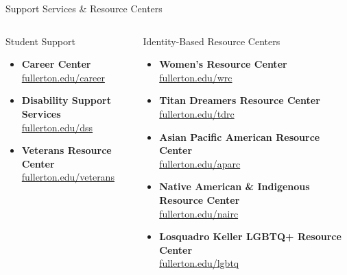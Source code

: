 \documentclass[10pt,aspectratio=169]{beamer}
\begin{document}
\begin{frame}{Support Services \& Resource Centers}
\footnotesize
\begin{columns}[T,onlytextwidth]
  \begin{block}{Student Support}
    \begin{itemize}\setlength{\itemsep}{2pt}
      \item \textbf{Career Center}\\[-2pt]
        {\scriptsize\href{https://www.fullerton.edu/career}{fullerton.edu/career}}
      \item \textbf{Disability Support Services}\\[-2pt]
        {\scriptsize\href{https://www.fullerton.edu/dss/}{fullerton.edu/dss}}
      \item \textbf{Veterans Resource Center}\\[-2pt]
        {\scriptsize\href{https://www.fullerton.edu/veterans}{fullerton.edu/veterans}}
    \end{itemize}
  \end{block}

  \begin{block}{Identity-Based Resource Centers}
    \begin{itemize}\setlength{\itemsep}{2pt}
      \item \textbf{Women's Resource Center}\\[-2pt]
        {\scriptsize\href{https://www.fullerton.edu/wrc/}{fullerton.edu/wrc}}
      \item \textbf{Titan Dreamers Resource Center}\\[-2pt]
        {\scriptsize\href{https://www.fullerton.edu/tdrc/}{fullerton.edu/tdrc}}
      \item \textbf{Asian Pacific American Resource Center}\\[-2pt]
        {\scriptsize\href{https://www.fullerton.edu/aparc/}{fullerton.edu/aparc}}
      \item \textbf{Native American \& Indigenous Resource Center}\\[-2pt]
        {\scriptsize\href{https://www.fullerton.edu/nairc/}{fullerton.edu/nairc}}
      \item \textbf{Losquadro Keller LGBTQ+ Resource Center}\\[-2pt]
        {\scriptsize\href{https://www.fullerton.edu/lgbtq/}{fullerton.edu/lgbtq}}
    \end{itemize}
  \end{block}
\end{columns}
\end{frame}
\end{document}
